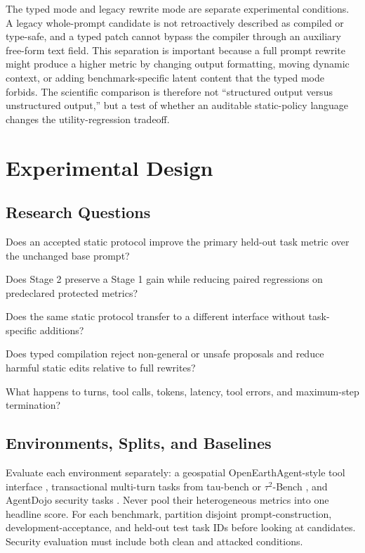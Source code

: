 \documentclass[10pt]{article}
\begin{document}
The typed mode and legacy rewrite mode are separate experimental conditions. A legacy whole-prompt candidate is not retroactively described as compiled or type-safe, and a typed patch cannot bypass the compiler through an auxiliary free-form text field. This separation is important because a full prompt rewrite might produce a higher metric by changing output formatting, moving dynamic context, or adding benchmark-specific latent content that the typed mode forbids. The scientific comparison is therefore not ``structured output versus unstructured output,'' but a test of whether an auditable static-policy language changes the utility-regression tradeoff.

\section{Experimental Design}
\subsection{Research Questions}
\begin{description}[style=nextline]
\item[RQ1: Utility] Does an accepted static protocol improve the primary held-out task metric over the unchanged base prompt?
\item[RQ2: Regression control] Does Stage 2 preserve a Stage 1 gain while reducing paired regressions on predeclared protected metrics?
\item[RQ3: Generalization] Does the same static protocol transfer to a different interface without task-specific additions?
\item[RQ4: Safety] Does typed compilation reject non-general or unsafe proposals and reduce harmful static edits relative to full rewrites?
\item[RQ5: Cost] What happens to turns, tool calls, tokens, latency, tool errors, and maximum-step termination?
\end{description}

\subsection{Environments, Splits, and Baselines}
Evaluate each environment separately: a geospatial OpenEarthAgent-style tool interface \cite{openearthagent}, transactional multi-turn tasks from tau-bench or $\tau^2$-Bench \cite{taubench,tau2}, and AgentDojo security tasks \cite{agentdojo}. Never pool their heterogeneous metrics into one headline score. For each benchmark, partition disjoint prompt-construction, development-acceptance, and held-out test task IDs before looking at candidates. Security evaluation must include both clean and attacked conditions.
\end{document}
